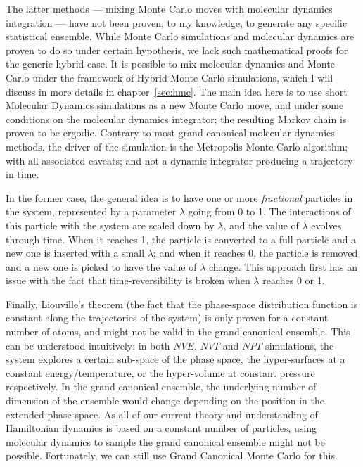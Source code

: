 \documentclass[thesis]{subfiles}
\begin{document}
The latter methods --- mixing Monte Carlo moves with molecular dynamics
integration --- have not been proven, to my knowledge, to generate any specific
statistical ensemble. While Monte Carlo simulations and molecular dynamics are
proven to do so under certain hypothesis, we lack such mathematical proofs for
the generic hybrid case. It is possible to mix molecular dynamics and Monte
Carlo under the framework of Hybrid Monte Carlo simulations, which I will
discuss in more details in chapter~\ref{sec:hmc}. The main idea here is to use
short Molecular Dynamics simulations as a new Monte Carlo move, and under some
conditions on the molecular dynamics integrator; the resulting Markov chain is
proven to be ergodic. Contrary to most grand canonical molecular dynamics
methods, the driver of the simulation is the Metropolis Monte Carlo algorithm;
with all associated caveats; and not a dynamic integrator producing a trajectory
in time.

In the former case, the general idea is to have one or more \emph{fractional}
particles in the system, represented by a parameter $\lambda$ going from 0 to 1.
The interactions of this particle with the system are scaled down by $\lambda$,
and the value of $\lambda$ evolves through time. When it reaches 1, the particle
is converted to a full particle and a new one is inserted with a small
$\lambda$; and when it reaches 0, the particle is removed and a new one is
picked to have the value of $\lambda$ change. This approach first has an issue
with the fact that time-reversibility is broken when $\lambda$ reaches 0 or 1.

Finally, Liouville's theorem (the fact that the phase-space distribution
function is constant along the trajectories of the system) is only proven for a
constant number of atoms, and might not be valid in the grand canonical
ensemble\cite{DelleSite2016}. This can be understood intuitively: in both $NVE$,
$NVT$ and $NPT$ simulations, the system explores a certain sub-space of the
phase space, the hyper-surfaces at a constant energy/temperature, or the
hyper-volume at constant pressure respectively. In the grand canonical ensemble,
the underlying number of dimension of the ensemble would change depending on the
position in the extended phase space. As all of our current theory and
understanding of Hamiltonian dynamics is based on a constant number of
particles, using molecular dynamics to sample the grand canonical ensemble might
not be possible. Fortunately, we can still use Grand Canonical Monte Carlo for
this.
\end{document}
